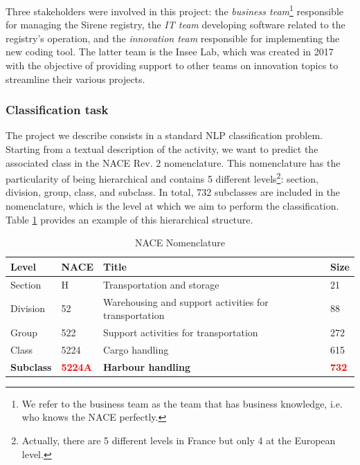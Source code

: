 \documentclass[graybox]{svmult}
\begin{document}
Three stakeholders were involved in this project: the \textit{business team}\footnote{We refer to the business team as the team that has business knowledge, i.e. who knows the NACE perfectly.} responsible for managing the Sirene registry, the \textit{IT team} developing software related to the registry's operation, and the \textit{innovation team} responsible for implementing the new coding tool. The latter team is the Insee Lab, which was created in 2017 with the objective of providing support to other teams on innovation topics to streamline their various projects.

\subsubsection{Classification task}

The project we describe consists in a standard NLP classification problem. Starting from a textual description of the activity, we want to predict the associated class in the NACE Rev. 2 nomenclature. This nomenclature has the particularity of being hierarchical and contains 5 different levels\footnote{Actually, there are 5 different levels in France but only 4 at the European level.}: section, division, group, class, and subclass. In total, 732 subclasses are included in the nomenclature, which is the level at which we aim to perform the classification. Table \ref{tab:nace-nomenclature} provides an example of this hierarchical structure.

\begin{table}[htbp]
    \centering
    \begin{tabular}{llll}
    \textbf{Level} & \textbf{NACE} & \textbf{Title} & \textbf{Size} \\ \hline
    Section & H & Transportation and storage & 21 \\ \hline
    Division & 52 & Warehousing and support activities for transportation & 88 \\ \hline
    Group & 522 & Support activities for transportation & 272 \\ \hline
    Class & 5224 & Cargo handling & 615 \\ \hline
    \textbf{Subclass} & \textbf{\textcolor{red}{5224A}} & \textbf{Harbour handling} & \textbf{\textcolor{red}{732}} \\ 
    \end{tabular}
    \caption{NACE Nomenclature}
    \label{tab:nace-nomenclature}
    \end{table}
\end{document}
